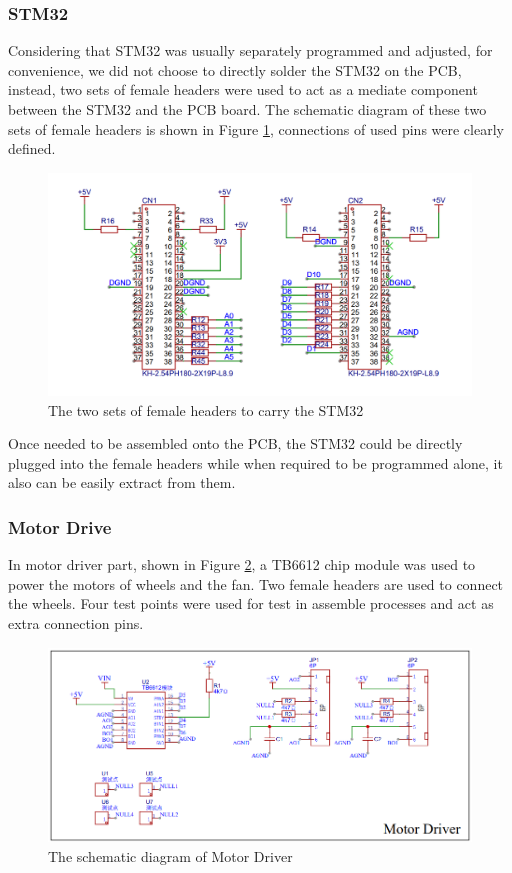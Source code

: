 \documentclass[12pt, a4paper, oneside]{report}
\begin{document}
\subsubsection{STM32}
Considering that STM32 was usually separately programmed and adjusted, for convenience, we did not choose to directly solder the STM32 on the PCB, instead, two sets of female headers were used to act as a mediate component between the STM32 and the PCB board. The schematic diagram of these two sets of female headers is shown in Figure \ref{fig:pcb4}, connections of used pins were clearly defined.

\begin{figure}[!h]
	\centering
	\includegraphics[scale=0.34]{pic/PCB_figure/4_PCB.png}
	\caption{The two sets of female headers to carry the STM32}
    \label{fig:pcb4}
\end{figure}

\noindent
Once needed to be assembled onto the PCB, the STM32 could be directly plugged into the female headers while when required to be programmed alone, it also can be easily extract from them.
\subsubsection{Motor Drive}
In motor driver part, shown in Figure \ref{fig:pcb5}, a TB6612 chip module was used to power the motors of wheels and the fan. Two female headers are used to connect the wheels. Four test points were used for test in assemble processes and act as extra connection pins.

\begin{figure}[!h]
	\centering
	\includegraphics[scale=0.6]{pic/PCB_figure/5_PCB.png}
	\caption{The schematic diagram of Motor Driver}
    \label{fig:pcb5}
\end{figure}
\end{document}
